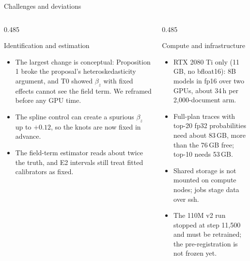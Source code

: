 \documentclass[aspectratio=169,10pt,t]{beamer}
\newcommand{\paneltitle}[1]{{\color{accentdark}\small\firasemibold #1}\par\vspace{0.8mm}}
\begin{document}
\begin{frame}{Challenges and deviations}
  \vspace{2mm}
  \begin{columns}[T,onlytextwidth]
    \begin{column}{0.485\textwidth}
      \begin{panel}[height=54mm]
        \paneltitle{Identification and estimation}
        \begin{itemize}\footnotesize
          \item The largest change is conceptual: Proposition 1 broke the proposal's
                heteroskedasticity argument, and T0 showed $\beta_z$ with fixed effects
                cannot see the field term. We reframed before any GPU time.
          \item The spline control can create a spurious $\beta_z$ up to $+0.12$, so the
                knots are now fixed in advance.
          \item The field-term estimator reads about twice the truth, and E2 intervals still
                treat fitted calibrators as fixed.
        \end{itemize}
      \end{panel}
    \end{column}
    \begin{column}{0.485\textwidth}
      \begin{panel}[height=54mm]
        \paneltitle{Compute and infrastructure}
        \begin{itemize}\footnotesize
          \item RTX 2080 Ti only (11\,GB, no bfloat16): 8B models in fp16 over two GPUs,
                about 34\,h per 2,000-document arm.
          \item Full-plan traces with top-20 fp32 probabilities need about 83\,GB, more than
                the 76\,GB free; top-10 needs 53\,GB.
          \item Shared storage is not mounted on compute nodes; jobs stage data over ssh.
          \item The 110M v2 run stopped at step 11,500 and must be retrained; the
                pre-registration is not frozen yet.
        \end{itemize}
      \end{panel}
    \end{column}
  \end{columns}
\end{frame}
\end{document}
